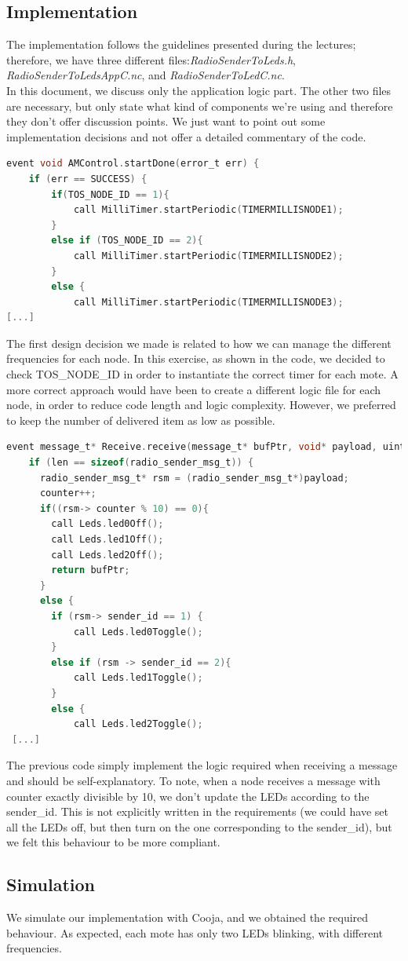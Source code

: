 \documentclass[12pt]{article}
\begin{document}
\subsection{Implementation}
The implementation follows the guidelines presented during the lectures; therefore, we have three different files:\emph{RadioSenderToLeds.h}, \\
\emph{RadioSenderToLedsAppC.nc}, and \emph{RadioSenderToLedC.nc}.\\
In this document, we discuss only the application logic part. The other two files are necessary, but only state what kind of components we're using and therefore they don't offer discussion points. We just want to point out some implementation decisions and not offer a detailed commentary of the code.

\begin{lstlisting}[language=C]
 event void AMControl.startDone(error_t err) {
    if (err == SUCCESS) {
    	if(TOS_NODE_ID == 1){
      		call MilliTimer.startPeriodic(TIMERMILLISNODE1);
      	}
      	else if (TOS_NODE_ID == 2){
      		call MilliTimer.startPeriodic(TIMERMILLISNODE2);
      	}			
      	else {
      		call MilliTimer.startPeriodic(TIMERMILLISNODE3); 
[...]
\end{lstlisting}

The first design decision we made is related to how we can manage the different frequencies for each node. In this exercise, as shown in the code, we decided to check TOS\_NODE\_ID in order to instantiate the correct timer for each mote. A more correct approach would have been to create a different logic file for each node, in order to reduce code length and logic complexity. However, we preferred to keep the number of delivered item as low as possible. 

\begin{lstlisting}[language=C]
  event message_t* Receive.receive(message_t* bufPtr, void* payload, uint8_t len) {
    if (len == sizeof(radio_sender_msg_t)) {
      radio_sender_msg_t* rsm = (radio_sender_msg_t*)payload;
      counter++;   
      if((rsm-> counter % 10) == 0){
      	call Leds.led0Off();
      	call Leds.led1Off();
      	call Leds.led2Off();
      	return bufPtr;
      }
      else {
      	if (rsm-> sender_id == 1) {
			call Leds.led0Toggle();
		}
      	else if (rsm -> sender_id == 2){
			call Leds.led1Toggle();
      	}
      	else {
			call Leds.led2Toggle();
 [...]
\end{lstlisting}

The previous code simply implement the logic required when receiving a message and should be self-explanatory. To note, when a node receives a message with counter exactly divisible by 10, we don't update the LEDs according to the sender\_id. This is not explicitly written in the requirements (we could have set all the LEDs off, but then turn on the one corresponding to the sender\_id), but we felt this behaviour to be more compliant.

\subsection{Simulation}
We simulate our implementation with Cooja, and we obtained the required behaviour. As expected, each mote has only two LEDs blinking, with different frequencies. 
\end{document}
